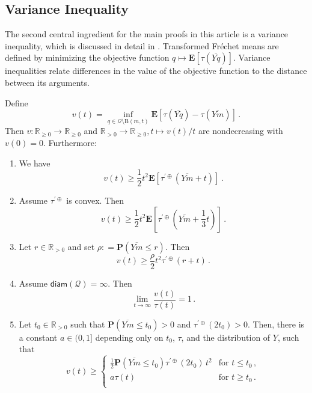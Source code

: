 \documentclass{article}
\newcommand*{\mc}[1]{\mathcal{#1}}
\newcommand{\R}{\mathbb{R}}
\newcommand{\Rp}{\R_{\geq0}}
\newcommand{\Rpp}{\R_{>0}}
\newcommand{\ball}{\mathrm{B}}
\newcommand{\lab}{\left[} %
\newcommand{\rab}{\right]} %
\newcommand{\ab}[1]{\lab #1 \rab} %
\newcommand{\abOf}[1]{\!\ab{#1}} %
\newcommand{\lb}{\left(} %
\newcommand{\rb}{\right)} %
\newcommand{\br}[1]{\lb #1 \rb} %
\newcommand{\brOf}[1]{\!\br{#1}} %
\renewcommand{\Pr}{\mathbf{P}} %
\newcommand{\Prof}[1]{\Pr(#1)}
\newcommand{\PrOf}[1]{\Pr\brOf{#1}}
\newcommand{\E}{\mathbf{E}} %
\newcommand{\Eof}[1]{\E[#1]}
\newcommand{\EOf}[1]{\E\abOf{#1}}
\newcommand{\eqcm}{\,,} %
\newcommand{\eqfs}{\,.}
\newcommand{\ol}[2]{\overline{#1#2}}
\newcommand{\tran}{\tau}
\newcommand{\ddrtran}{\tau^{\prime\oplus}}
\newcommand{\diam}{\mathsf{diam}}
\newcommand{\ballopen}{\ball}
\begin{document}
\subsection{Variance Inequality}
%
The second central ingredient for the main proofs in this article is a variance inequality, which is discussed in detail in \cite{varinequ}.
Transformed Fr\'echet means are defined by minimizing the objective function $q \mapsto \Eof{\tran(\ol Yq)}$.
Variance inequalities relate differences in the value of the objective function to the distance between its arguments.
%
\begin{proposition}\label{thm:infdtr:vi}
    Define
    \begin{equation}
        v(t) = \inf_{q\in\mc Q\setminus\ballopen(m,t)}\EOf{\tran(\ol Yq)-\tran(\ol Ym)}
        \eqfs
    \end{equation}
    Then $v \colon \Rp\to\Rp$ and $\Rpp\to\Rp,t\mapsto v(t)/t$ are nondecreasing with $v(0)=0$. Furthermore:
    \begin{enumerate}[label=(\roman*)]
        \item \label{thm:infdtr:vi:default}
        We have
        \begin{equation}
            v(t) \geq \frac12 t^2 \EOf{\ddrtran\brOf{\ol Ym + t}}
            \eqfs
        \end{equation}
        \item \label{thm:infdtr:vi:convex}
        Assume $\ddrtran$ is convex. Then
        \begin{equation}
            v(t) \geq \frac12 t^2 \EOf{\ddrtran\brOf{\ol Ym + \frac13 t}}
            \eqfs
        \end{equation}
        \item \label{thm:infdtr:vi:quantile}
        Let $r\in\Rpp$ and set $\rho : =\Prof{\ol Ym\leq r}$. Then
        \begin{equation}
            v(t) \geq \frac\rho2 t^2 \ddrtran\brOf{r + t}
            \eqfs
        \end{equation}        
        \item \label{thm:infdtr:vi:infty}
        Assume $\diam(\mc Q) = \infty$. Then
        \begin{equation}
            \lim_{t\to\infty} \frac{v(t)}{\tran(t)} = 1
            \eqfs
        \end{equation}
        \item \label{thm:infdtr:vi:combined}
        Let $t_0 \in \Rpp$ such that $\PrOf{\ol Ym \leq t_0} > 0$ and $\ddrtran(2t_0)>0$. Then, there is a constant $a\in(0,1]$ depending only on $t_0$, $\tran$, and the distribution of $Y$, such that
        \begin{equation}
            v(t)
            \geq 
            \begin{cases}
                \frac12 \PrOf{\ol Ym \leq t_0} \ddrtran(2t_0)\,t^2 &\text{for } t \leq t_0\eqcm\\
                a \tran(t) &\text{for } t\geq t_0 \eqfs\\
            \end{cases}
        \end{equation}
    \end{enumerate}
\end{proposition}
\end{document}
